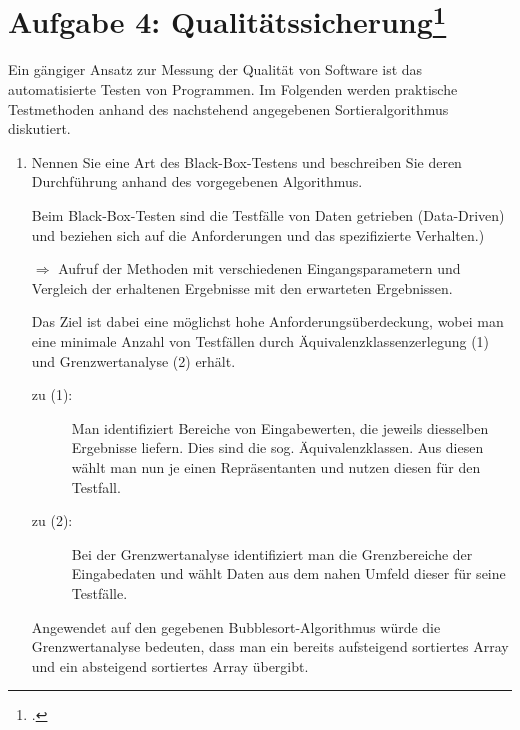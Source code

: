 \documentclass{lehramt-informatik-minimal}
\begin{document}
\section{Aufgabe 4: Qualitätssicherung\footcite{examen:46116:2017:09}}

Ein gängiger Ansatz zur Messung der Qualität von Software ist das
automatisierte Testen von Programmen. Im Folgenden werden praktische
Testmethoden anhand des nachstehend angegebenen Sortieralgorithmus
diskutiert.



\begin{enumerate}


\item Nennen Sie eine Art des Black-Box-Testens und beschreiben Sie
deren Durchführung anhand des vorgegebenen Algorithmus.

\begin{antwort}
Beim Black-Box-Testen sind die Testfälle von Daten getrieben
(Data-Driven) und beziehen sich auf die Anforderungen und das
spezifizierte Verhalten.)

$\Rightarrow$ Aufruf der Methoden mit verschiedenen
Eingangsparametern und Vergleich der erhaltenen Ergebnisse mit den
erwarteten Ergebnissen.

Das Ziel ist dabei eine möglichst hohe Anforderungsüberdeckung, wobei
man eine minimale Anzahl von Testfällen durch Äquivalenzklassenzerlegung
(1) und Grenzwertanalyse (2) erhält.

\begin{description}
\item[zu (1):] Man identifiziert Bereiche von Eingabewerten, die jeweils
diesselben Ergebnisse liefern. Dies sind die sog. Äquivalenzklassen. Aus
diesen wählt man nun je einen Repräsentanten und nutzen diesen für den
Testfall.

\item[zu (2):] Bei der Grenzwertanalyse identifiziert man die
Grenzbereiche der Eingabedaten und wählt Daten aus dem nahen Umfeld
dieser für seine Testfälle.
\end{description}

Angewendet auf den gegebenen Bubblesort-Algorithmus würde die
Grenzwertanalyse bedeuten, dass man ein bereits aufsteigend sortiertes
Array und ein absteigend sortiertes Array übergibt.
\end{antwort}


\end{enumerate}
\end{document}
